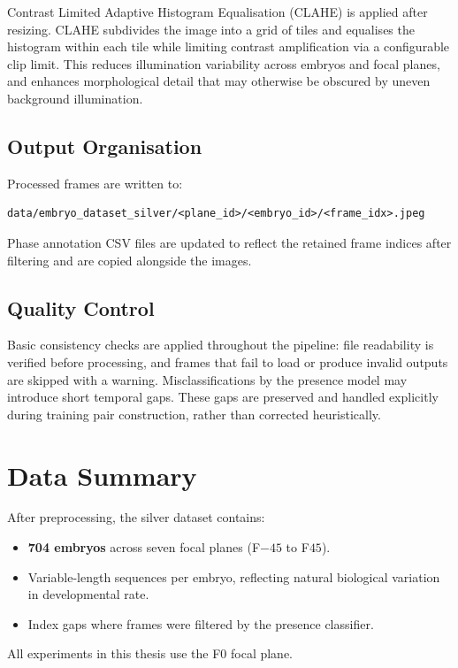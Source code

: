 \documentclass[12pt, a4paper, twoside]{report}
\begin{document}
Contrast Limited Adaptive Histogram Equalisation (CLAHE) is applied after
resizing.
CLAHE subdivides the image into a grid of tiles and equalises the histogram
within each tile while limiting contrast amplification via a configurable clip
limit.
This reduces illumination variability across embryos and focal planes, and
enhances morphological detail that may otherwise be obscured by uneven
background illumination.

\subsection{Output Organisation}
\label{ssec:silver_layout}

Processed frames are written to:
\begin{verbatim}
data/embryo_dataset_silver/<plane_id>/<embryo_id>/<frame_idx>.jpeg
\end{verbatim}
Phase annotation CSV files are updated to reflect the retained frame indices
after filtering and are copied alongside the images.

\subsection{Quality Control}
\label{ssec:quality_control}

Basic consistency checks are applied throughout the pipeline:
file readability is verified before processing, and frames that fail to load
or produce invalid outputs are skipped with a warning.
Misclassifications by the presence model may introduce short temporal gaps.
These gaps are preserved and handled explicitly during training pair
construction, rather than corrected heuristically.

\section{Data Summary}
\label{sec:data_summary}

After preprocessing, the silver dataset contains:
\begin{itemize}
  \item \textbf{704 embryos} across seven focal planes (F$-45$ to F$45$).
  \item Variable-length sequences per embryo, reflecting natural biological
        variation in developmental rate.
  \item Index gaps where frames were filtered by the presence classifier.
\end{itemize}
All experiments in this thesis use the F$0$ focal plane.
\end{document}
